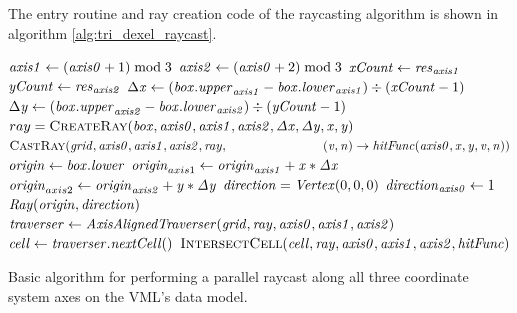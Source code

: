 The entry routine and ray creation code of the raycasting algorithm is shown in algorithm \ref{alg:tri_dexel_raycast}.
%
\begin{algorithm}
	\centering
	\begin{algorithmic}[1]
				\State $\mathit{axis1} \gets (\mathit{axis0} + 1) \bmod 3$
				\State $\mathit{axis2} \gets (\mathit{axis0} + 2) \bmod 3$
				\State $\mathit{xCount} \gets \mathit{res}_{\mathit{axis1}}$
				\State $\mathit{yCount} \gets \mathit{res}_{\mathit{axis2}}$
				\State $\Delta \mathit{x} \gets (\mathit{box}.\mathit{upper}_{\mathit{axis1}} - \mathit{box}.\mathit{lower}_{\mathit{axis1}}) \div (\mathit{xCount} - 1)$
				\State $\Delta \mathit{y} \gets (\mathit{box}.\mathit{upper}_{\mathit{axis2}} - \mathit{box}.\mathit{lower}_{\mathit{axis2}}) \div (\mathit{yCount} - 1)$
						\State $ray = \Call{CreateRay}{\var{box}, \var{axis0}, \var{axis1}, \var{axis2}, \var{\Delta x}, \var{\Delta y}, \var{x}, \var{y}}$
						\State $\Call{CastRay}{\var{grid}, \var{axis0}, \var{axis1}, \var{axis2}, \var{ray},\hfill\break
							\hspace*{\dimexpr\algorithmicindent*5}(\var{v}, \var{n}) \rightarrow \var{hitFunc}(\var{axis0}, \var{x}, \var{y}, \var{v}, \var{n})}$
					\EndFor
				\EndFor
			\EndFor
		\EndProcedure
		\\
			\State $\mathit{origin} \gets \mathit{box}.\mathit{lower}$
			\State $\mathit{origin}_{axis1} \gets \mathit{origin}_{\mathit{axis1}} + \mathit{x} * \mathit{\Delta x}$
			\State $\mathit{origin}_{axis2} \gets \mathit{origin}_{\mathit{axis2}} + \mathit{y} * \mathit{\Delta y}$
			\State $\mathit{direction} = \mathit{Vertex}(0, 0, 0)$
			\State $\mathit{direction}_{\mathit{axis0}} \gets 1$
			\State \Return $\mathit{Ray}(\mathit{origin}, \mathit{direction})$
		\EndFunction
		\\
			\State $\mathit{traverser} \gets \mathit{AxisAlignedTraverser}(\mathit{grid}, \mathit{ray}, \mathit{axis0}, \mathit{axis1}, \mathit{axis2})$
				\State $\mathit{cell} \gets \mathit{traverser}.\mathit{nextCell}()$
				\State $\Call{IntersectCell}{\var{cell}, \var{ray}, \var{axis0}, \var{axis1}, \var{axis2}, \var{hitFunc}}$
			\EndWhile
		\EndProcedure
	\end{algorithmic}
	\caption{
		Basic algorithm for performing a parallel raycast along all three coordinate system axes on the VML's data model.
	}
	\label{alg:tri_dexel_raycast}
\end{algorithm}
